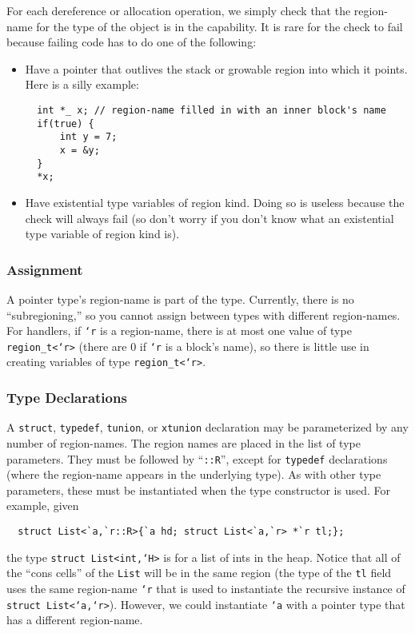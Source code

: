 For each dereference or allocation operation, we simply check that the
region-name for the type of the object is in the capability.  It is
rare for the check to fail because failing code has to do one of the
following:
\begin{itemize}
\item Have a pointer that outlives the stack or growable region into
  which it points.  Here is a silly example:
\begin{verbatim}
  int *_ x; // region-name filled in with an inner block's name
  if(true) {
      int y = 7;
      x = &y;
  }
  *x; 
\end{verbatim}

\item Have existential type variables of region kind.  Doing so is
  useless because the check will always fail (so don't worry if you
  don't know what an existential type variable of region kind is).
\end{itemize}

\subsubsection{Assignment}

A pointer type's region-name is part of the type.  Currently, there is
no ``subregioning,'' so you cannot assign between types with different
region-names.  For handlers, if \texttt{`r} is a region-name, there is
at most one value of type \texttt{region_t<`r>} (there are 0 if
\texttt{`r} is a block's name), so there is little use in creating
variables of type \texttt{region_t<`r>}.

\subsubsection{Type Declarations}

A \texttt{struct}, \texttt{typedef}, \texttt{tunion}, or \texttt{xtunion}
declaration may be parameterized by any number of region-names.  The
region names are placed in the list of type parameters.  They must be
followed by ``\texttt{::R}'', except for \texttt{typedef} declarations
(where the region-name appears in the underlying type).  As with other
type parameters, these must be instantiated when the type constructor
is used.  For example, given
\begin{verbatim}
  struct List<`a,`r::R>{`a hd; struct List<`a,`r> *`r tl;};
\end{verbatim}
the type \texttt{struct List<int,`H>} is for a list of ints in the heap.
Notice that all of the ``cons cells'' of the \texttt{List} will be in
the same region (the type of the \texttt{tl} field uses the same
region-name \texttt{`r} that is used to instantiate the recursive
instance of \texttt{struct List<`a,`r>}).  However, we could instantiate
\texttt{`a} with a pointer type that has a different region-name.

